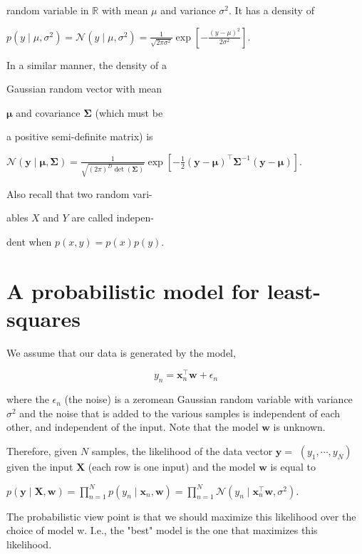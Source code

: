 \documentclass[10pt]{article}
\begin{document}
random variable in $\mathbb{R}$ with mean $\mu$ and variance $\sigma^{2}$. It has a density of

$p\left(y \mid \mu, \sigma^{2}\right)=\mathcal{N}\left(y \mid \mu, \sigma^{2}\right)=\frac{1}{\sqrt{2 \pi \sigma^{2}}} \exp \left[-\frac{(y-\mu)^{2}}{2 \sigma^{2}}\right]$.

In a similar manner, the density of a

Gaussian random vector with mean

$\boldsymbol{\mu}$ and covariance $\boldsymbol{\Sigma}$ (which must be

a positive semi-definite matrix) is

$\mathcal{N}(\mathbf{y} \mid \boldsymbol{\mu}, \boldsymbol{\Sigma})=\frac{1}{\sqrt{(2 \pi)^{D} \operatorname{det}(\boldsymbol{\Sigma})}} \exp \left[-\frac{1}{2}(\mathbf{y}-\boldsymbol{\mu})^{\top} \boldsymbol{\Sigma}^{-1}(\mathbf{y}-\boldsymbol{\mu})\right]$.

Also recall that two random vari-

ables $X$ and $Y$ are called indepen-

dent when $p(x, y)=p(x) p(y)$.

\section*{A probabilistic model for least-squares}
We assume that our data is generated by the model,

$$
y_{n}=\mathbf{x}_{n}^{\top} \mathbf{w}+\epsilon_{n}
$$

where the $\epsilon_{n}$ (the noise) is a zeromean Gaussian random variable with variance $\sigma^{2}$ and the noise that is added to the various samples is independent of each other, and independent of the input. Note that the model $\mathbf{w}$ is unknown.

Therefore, given $N$ samples, the likelihood of the data vector $\mathbf{y}=$ $\left(y_{1}, \cdots, y_{N}\right)$ given the input $\mathbf{X}$ (each row is one input) and the model $\mathbf{w}$ is equal to

$p(\mathbf{y} \mid \mathbf{X}, \mathbf{w})=\prod_{n=1}^{N} p\left(y_{n} \mid \mathbf{x}_{n}, \mathbf{w}\right)=\prod_{n=1}^{N} \mathcal{N}\left(y_{n} \mid \mathbf{x}_{n}^{\top} \mathbf{w}, \sigma^{2}\right)$.

The probabilistic view point is that we should maximize this likelihood over the choice of model w. I.e., the "best" model is the one that maximizes this likelihood.
\end{document}
